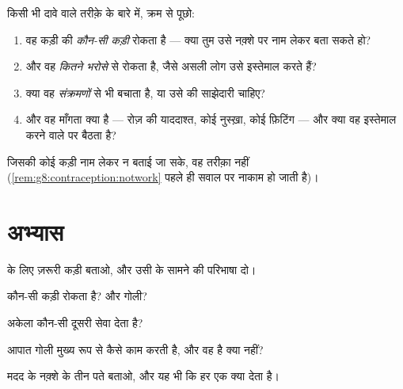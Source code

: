\begin{method}\label{met:g8:contraception:evaluate}
किसी भी दावे वाले तरीक़े के बारे में, क्रम से पूछो:
\begin{enumerate}
  \item वह कड़ी की \emph{कौन-सी कड़ी} रोकता है --- क्या तुम उसे नक़्शे
        पर नाम लेकर बता सकते हो?
  \item और वह \emph{कितने भरोसे} से रोकता है, जैसे असली लोग उसे
        इस्तेमाल करते हैं?
  \item क्या वह \emph{संक्रमणों} से भी बचाता है, या उसे  की
        साझेदारी चाहिए?
  \item और वह माँगता क्या है --- रोज़ की याददाश्त, कोई नुस्ख़ा, कोई
        फ़िटिंग --- और क्या वह इस्तेमाल करने वाले पर बैठता है?
\end{enumerate}
जिसकी कोई कड़ी नाम लेकर न बताई जा सके, वह तरीक़ा नहीं
(\cref{rem:g8:contraception:notwork} पहले ही सवाल पर नाकाम हो जाती
है)।
\end{method}

\section{अभ्यास}

\begin{exercise}[$\star$]\label{exo:g8:contraception:1}
 के लिए ज़रूरी कड़ी बताओ, और उसी के सामने  की
परिभाषा दो।
\end{exercise}

\begin{exercise}[$\star$]\label{exo:g8:contraception:2}
 कौन-सी कड़ी रोकता है? और गोली?
\end{exercise}

\begin{exercise}[$\star$]\label{exo:g8:contraception:3}
 अकेला कौन-सी दूसरी सेवा देता है?
\end{exercise}

\begin{exercise}[$\star$]\label{exo:g8:contraception:4}
आपात गोली मुख्य रूप से कैसे काम करती है, और वह है क्या नहीं?
\end{exercise}

\begin{exercise}[$\star$]\label{exo:g8:contraception:5}
मदद के नक़्शे के तीन पते बताओ, और यह भी कि हर एक क्या देता है।
\end{exercise}

